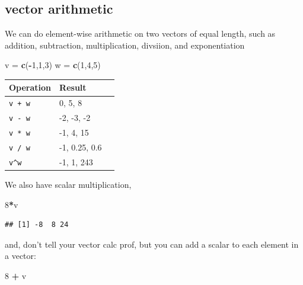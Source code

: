 \documentclass[
]{book}
\newenvironment{Shaded}{\begin{snugshade}}{\end{snugshade}}
\newcommand{\DecValTok}[1]{\textcolor[rgb]{0.00,0.00,0.81}{#1}}
\newcommand{\FunctionTok}[1]{\textcolor[rgb]{0.13,0.29,0.53}{\textbf{#1}}}
\newcommand{\NormalTok}[1]{#1}
\newcommand{\OtherTok}[1]{\textcolor[rgb]{0.56,0.35,0.01}{#1}}
\newcommand{\SpecialCharTok}[1]{\textcolor[rgb]{0.81,0.36,0.00}{\textbf{#1}}}
\theoremstyle{definition}
\theoremstyle{definition}
\theoremstyle{definition}
\theoremstyle{definition}
\theoremstyle{remark}
\begin{document}
\subsection{vector arithmetic}\label{vector-arithmetic}

We can do element-wise arithmetic on two vectors of equal length, such as addition, subtraction, multiplication, divsiion, and exponentiation

\begin{Shaded}
\begin{Highlighting}[]
\NormalTok{v }\OtherTok{=} \FunctionTok{c}\NormalTok{(}\SpecialCharTok{{-}}\DecValTok{1}\NormalTok{,}\DecValTok{1}\NormalTok{,}\DecValTok{3}\NormalTok{)}
\NormalTok{w }\OtherTok{=} \FunctionTok{c}\NormalTok{(}\DecValTok{1}\NormalTok{,}\DecValTok{4}\NormalTok{,}\DecValTok{5}\NormalTok{)}
\end{Highlighting}
\end{Shaded}

\begin{longtable}[]{@{}lll@{}}
\toprule\noalign{}
Operation & Result & \\
\midrule\noalign{}
\endhead
\bottomrule\noalign{}
\endlastfoot
\texttt{v\ +\ w} & 0, 5, 8 & \\
\texttt{v\ -\ w} & -2, -3, -2 & \\
\texttt{v\ *\ w} & -1, 4, 15 & \\
\texttt{v\ /\ w} & -1, 0.25, 0.6 & \\
\texttt{v\^{}w} & -1, 1, 243 & \\
\end{longtable}

We also have scalar multiplication,

\begin{Shaded}
\begin{Highlighting}[]
\DecValTok{8}\SpecialCharTok{*}\NormalTok{v}
\end{Highlighting}
\end{Shaded}

\begin{verbatim}
## [1] -8  8 24
\end{verbatim}

and, don't tell your vector calc prof, but you can add a scalar to each element in a vector:

\begin{Shaded}
\begin{Highlighting}[]
\DecValTok{8} \SpecialCharTok{+}\NormalTok{ v}
\end{Highlighting}
\end{Shaded}
\end{document}
